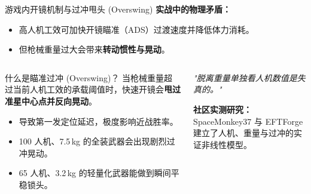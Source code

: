 \documentclass[aspectratio=169]{beamer}
\begin{document}
\begin{frame}{游戏内开镜机制与过冲甩头 (Overswing)}
    \textbf{实战中的物理矛盾：}
    \begin{itemize}
        \item 高人机工效可加快开镜瞄准（ADS）过渡速度并降低体力消耗。
        \item 但枪械重量过大会带来\textbf{转动惯性与晃动}。
    \end{itemize}

    \vspace{0.3cm}
    \begin{columns}
        \begin{block}{什么是瞄准过冲 (Overswing)？}
            当枪械重量超过当前人机工效的承载阈值时，快速开镜会\textbf{甩过准星中心点并反向晃动}。
            \begin{itemize}
                \item 导致第一发定位延迟，极度影响近战胜率。
                \item 100 人机、7.5\,kg 的全装武器会出现剧烈过冲晃动。
                \item 65 人机、3.2\,kg 的轻量化武器能做到瞬间平稳锁头。
            \end{itemize}
        \end{block}

        \begin{center}
        \textit{"脱离重量单独看人机数值是失真的。"}
        
        \vspace{0.3cm}
        \textbf{社区实测研究：}\\
        SpaceMonkey37 与 EFTForge 建立了人机、重量与过冲的实证非线性模型。
        \end{center}
    \end{columns}
\end{frame}
\end{document}
